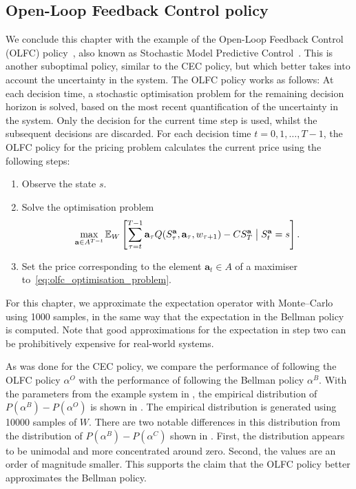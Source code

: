 \documentclass[main.tex]{subfiles}
\begin{document}
\subsection{Open-Loop Feedback Control policy}
We conclude this chapter with the example of the Open-Loop
Feedback Control (OLFC) policy~\citep[Ch.~6]{bertsekas2005dynamic},
also known as Stochastic Model
Predictive Control~\citep{farmer2017uncertainty}. This is another suboptimal policy,
similar to the CEC policy, but which better takes into account the uncertainty in the system.
The OLFC policy works as follows: At each decision time, a stochastic
optimisation problem for the remaining decision horizon is
solved, based on the most recent quantification of the uncertainty in the
system. Only the decision for the current time step is used, whilst
the subsequent decisions are discarded.
For each decision time $t=0,1,\dots,T-1$, the OLFC policy for the
pricing problem calculates the current price using the following steps:
\begin{enumerate}
\item Observe the state $s$.
\item Solve the optimisation problem
  \begin{equation}\label{eq:olfc_optimisation_problem}
    \max_{\mathbf a\in A^{T-t}}\mathbb{E}_W\left[
      \sum_{\tau=t}^{T-1}\mathbf a_\tau Q(S_\tau^{\mathbf a},\mathbf
      a_\tau,w_{\tau+1})-CS_T^{\mathbf a} \bigm\vert S_t^{\mathbf a}=s \right].
  \end{equation}
\item Set the price corresponding to the element
  $\mathbf{a}_t\in A$ of a maximiser to~\eqref{eq:olfc_optimisation_problem}.
\end{enumerate}
For this chapter, we approximate the expectation operator with
Monte--Carlo using \num{1000} samples, in the same way that the expectation
in the Bellman policy is computed.
Note that good approximations for the expectation in step two can be
prohibitively expensive for real-world systems.

As was done for the CEC policy, we compare the performance of following the
OLFC policy $\alpha^O$ with the performance of following the Bellman
policy $\alpha^B$. With the parameters from the example system in
,
the empirical distribution of $P(\alpha^B)-P(\alpha^O)$ is shown in
. The empirical distribution is generated
using \num{10000} samples of $W$.
There are two notable differences in this distribution from the
distribution of $P(\alpha^B)-P(\alpha^C)$ shown in .
First, the distribution appears to be unimodal and more concentrated around zero. Second,
the values are an order of magnitude smaller.
This supports the claim that the OLFC policy better approximates the
Bellman policy.
\end{document}
